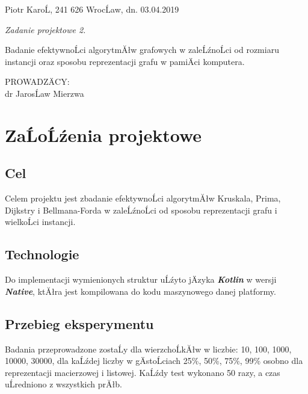 \documentclass[a4paper, 11pt]{article}
\begin{document}
	
	\thispagestyle{empty}
	\noindent
	Piotr KaroĹ, 241 626 \hfill WrocĹaw, dn. 03.04.2019\\
	
	\hfill
	
	\vspace{1cm}
	\begin{center}
		
		\begin{Large}
			\emph{Zadanie projektowe 2.}\\
		\end{Large}
		Badanie efektywnoĹci algorytmĂłw grafowych w zaleĹźnoĹci od rozmiaru instancji oraz sposobu reprezentacji grafu w pamiÄci komputera.
	\end{center}
	
	\vspace{0.2ex}
	\begin{flushright}
		\begin{minipage}[t]{0.4\columnwidth}
			\noindent
			PROWADZÄCY:\\
			dr JarosĹaw Mierzwa
		\end{minipage}
	\end{flushright}
	\newpage
	\tableofcontents
	\newpage
	
	\section{ZaĹoĹźenia projektowe}
	
	\subsection{Cel}
	\label{sec:cel}
	Celem projektu jest zbadanie efektywnoĹci algorytmĂłw Kruskala, Prima, Dijkstry i Bellmana-Forda w zaleĹźnoĹci od sposobu reprezentacji grafu i wielkoĹci instancji.
	\subsection{Technologie}
	\label{sec:technologie}
	Do implementacji wymienionych struktur uĹźyto jÄzyka \textbf{\textit{Kotlin}} w wersji \textbf{\textit{Native}},
	ktĂłra jest kompilowana do kodu maszynowego danej platformy.
	
	\subsection{Przebieg eksperymentu}
	\label{sec:przebieg}
	
	Badania przeprowadzone zostaĹy dla wierzchoĹkĂłw w liczbie: 10, 100, 1000, 10000, 30000,
	dla kaĹźdej liczby w gÄstoĹciach 25\%, 50\%, 75\%, 99\% osobno dla reprezentacji macierzowej i listowej. KaĹźdy test wykonano 50 razy, a czas uĹredniono z wszystkich prĂłb. 
	
\end{document}
